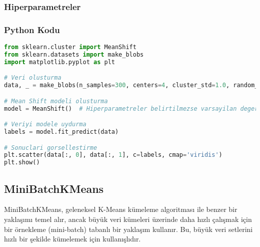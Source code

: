 \subsubsection{Hiperparametreler}

\begin{table}[h]
\centering
{\scriptsize\renewcommand{\arraystretch}{0.4}
{}}
\end{table}

\subsubsection{Python Kodu}

\begin{lstlisting}[language=Python, caption=Scikit-learn'de MeanShift örneği.]
from sklearn.cluster import MeanShift
from sklearn.datasets import make_blobs
import matplotlib.pyplot as plt

# Veri olusturma
data, _ = make_blobs(n_samples=300, centers=4, cluster_std=1.0, random_state=42)

# Mean Shift modeli olusturma
model = MeanShift()  # Hiperparametreler belirtilmezse varsayilan degerler kullanilir

# Veriyi modele uydurma
labels = model.fit_predict(data)

# Sonuclari gorsellestirme
plt.scatter(data[:, 0], data[:, 1], c=labels, cmap='viridis')
plt.show()
\end{lstlisting}

\newpage

\subsection{MiniBatchKMeans}
MiniBatchKMeans, geleneksel K-Means kümeleme algoritması ile benzer bir yaklaşımı temel alır, ancak büyük veri kümeleri üzerinde daha hızlı çalışmak için bir örnekleme (mini-batch) tabanlı bir yaklaşım kullanır. Bu, büyük veri setlerini hızlı bir şekilde kümelemek için kullanışlıdır.

